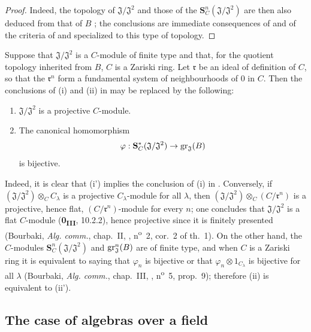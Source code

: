 \begin{proof}
Indeed, the topology of $\mathfrak{J}/\mathfrak{J}^2$ and those of the $\mathbf{S}_C^n(\mathfrak{J}/\mathfrak{J}^2)$ are then also deduced from that of $B$ ;
the conclusions are immediate consequences of  and of the criteria of  and  specialized to this type of topology.
\end{proof}

\begin{remark}[19.5.8]
\label{0.19.5.8}
Suppose that $\mathfrak{J}/\mathfrak{J}^2$ is a $C$-module of finite type and that, for the quotient topology inherited from $B$, $C$ is a Zariski ring.
Let $\mathfrak{r}$ be an ideal of definition of $C$, so that the $\mathfrak{r}^n$ form a fundamental system of neighbourhoods of $0$ in $C$.
Then the conclusions of {\rm(i)} and {\rm(ii)} in  may be replaced by the following:
\begin{enumerate}
  \item[\rm(i')] $\mathfrak{J}/\mathfrak{J}^2$ is a projective $C$-module.
  \item[\rm(ii')] The canonical homomorphism
  \[
    \varphi:\mathbf{S}_C^*(\mathfrak{J}/\mathfrak{J}^2)\to\operatorname{gr}_\mathfrak{J}(B)
  \]
  is bijective.
\end{enumerate}
Indeed, it is clear that {\rm(i')} implies the conclusion of {\rm(i)} in .
Conversely, if $(\mathfrak{J}/\mathfrak{J}^2)\otimes_C C_\lambda$ is a projective $C_\lambda$-module for all $\lambda$, then $(\mathfrak{J}/\mathfrak{J}^2)\otimes_C(C/\mathfrak{r}^n)$ is a projective, hence flat, $(C/\mathfrak{r}^n)$-module for every $n$;
one concludes that $\mathfrak{J}/\mathfrak{J}^2$ is a flat $C$-module (\textbf{0\textsubscript{III}}, 10.2.2), hence projective since it is finitely presented (Bourbaki, \emph{Alg. comm.}, chap.~II, , n\textsuperscript{o}~2, cor.~2 of th.~1).
On the other hand, the $C$-modules $\mathbf{S}_C^n(\mathfrak{J}/\mathfrak{J}^2)$ and $\operatorname{gr}_\mathfrak{J}^n(B)$ are of finite type, and when $C$ is a Zariski ring it is equivalent to saying that $\varphi_n$ is bijective or that $\varphi_n\otimes 1_{C_\lambda}$ is bijective for all $\lambda$ (Bourbaki, \emph{Alg. comm.}, chap.~III, , n\textsuperscript{o}~5, prop.~9);
therefore {\rm(ii)} is equivalent to {\rm(ii')}.
\end{remark}

\subsection{The case of algebras over a field}
\label{subsection:0.19.6}

